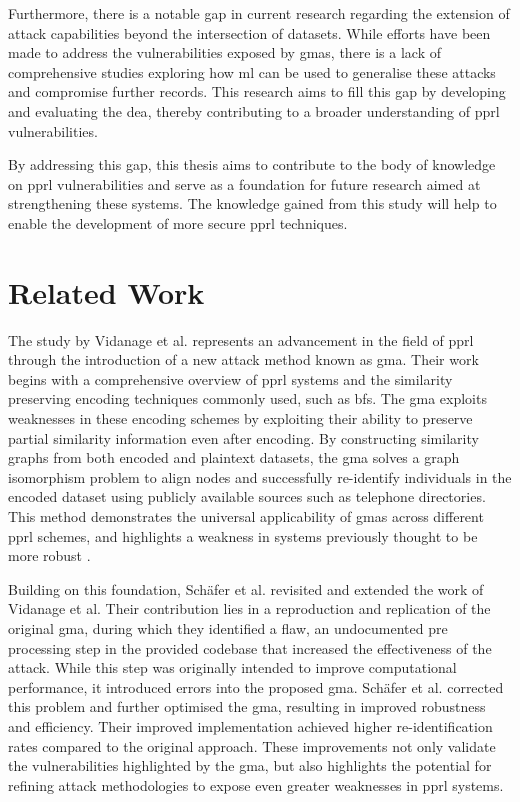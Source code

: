 Furthermore, there is a notable gap in current research regarding the extension of attack capabilities beyond the intersection of datasets.
While efforts have been made to address the vulnerabilities exposed by \ac{gma}s, there is a lack of comprehensive studies exploring how \ac{ml} can be used to generalise these attacks and compromise further records.
This research aims to fill this gap by developing and evaluating the \ac{dea}, thereby contributing to a broader understanding of \ac{pprl} vulnerabilities.

By addressing this gap, this thesis aims to contribute to the body of knowledge on \ac{pprl} vulnerabilities and serve as a foundation for future research aimed at strengthening these systems.
The knowledge gained from this study will help to enable the development of more secure \ac{pprl} techniques.

\section{Related Work}  \label{sec:rel-work}

The study by Vidanage et al. \cite{vidanage2020graph} represents an advancement in the field of \ac{pprl} through the introduction of a new attack method known as \ac{gma}.
Their work begins with a comprehensive overview of \ac{pprl} systems and the similarity preserving encoding techniques commonly used, such as \ac{bf}s.
The \ac{gma} exploits weaknesses in these encoding schemes by exploiting their ability to preserve partial similarity information even after encoding.
By constructing similarity graphs from both encoded and plaintext datasets, the \ac{gma} solves a graph isomorphism problem to align nodes and successfully re-identify individuals in the encoded dataset using publicly available sources such as telephone directories.
This method demonstrates the universal applicability of \ac{gma}s across different \ac{pprl} schemes, and highlights a weakness in systems previously thought to be more robust \cite{vidanage2020graph}.

Building on this foundation, Schäfer et al. \cite{schaefer2024} revisited and extended the work of Vidanage et al.
Their contribution lies in a reproduction and replication of the original \ac{gma}, during which they identified a flaw, an undocumented pre processing step in the provided codebase that increased the effectiveness of the attack.
While this step was originally intended to improve computational performance, it introduced errors into the proposed \ac{gma}.
Schäfer et al. \cite{schaefer2024} corrected this problem and further optimised the \ac{gma}, resulting in improved robustness and efficiency.
Their improved implementation achieved higher re-identification rates compared to the original approach.
These improvements not only validate the vulnerabilities highlighted by the \ac{gma}, but also highlights the potential for refining attack methodologies to expose even greater weaknesses in \ac{pprl} systems.

